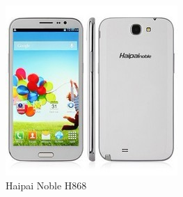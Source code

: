 	\begin{figure}[H]
			\centering
			\includegraphics[scale=1]{images/ProjectComponents/android.jpg}
			\caption{Haipai Noble H868}
			\label{HaipaiNoble}
	\end{figure}
	\bigskip

